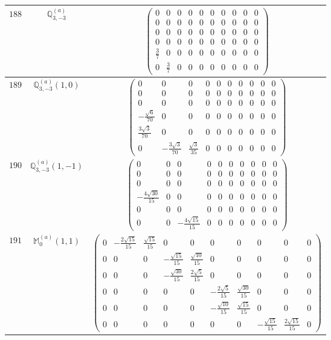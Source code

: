 \documentclass[fleqn,8pt,landscape]{jsarticle}
\begin{document}
\begin{center}
\begin{longtable}{ccc}
$ 188 $ & $ \mathbb{Q}_{3,-3}^{(a)} $ & $ \begin{pmatrix} 0 & 0 & 0 & 0 & 0 & 0 & 0 & 0 & 0 & 0 \\ 0 & 0 & 0 & 0 & 0 & 0 & 0 & 0 & 0 & 0 \\ 0 & 0 & 0 & 0 & 0 & 0 & 0 & 0 & 0 & 0 \\ 0 & 0 & 0 & 0 & 0 & 0 & 0 & 0 & 0 & 0 \\ \frac{3}{7} & 0 & 0 & 0 & 0 & 0 & 0 & 0 & 0 & 0 \\ 0 & \frac{3}{7} & 0 & 0 & 0 & 0 & 0 & 0 & 0 & 0 \end{pmatrix} $ \\ \hline
$ 189 $ & $ \mathbb{Q}_{3,-3}^{(a)}(1,0) $ & $ \begin{pmatrix} 0 & 0 & 0 & 0 & 0 & 0 & 0 & 0 & 0 & 0 \\ 0 & 0 & 0 & 0 & 0 & 0 & 0 & 0 & 0 & 0 \\ 0 & 0 & 0 & 0 & 0 & 0 & 0 & 0 & 0 & 0 \\ - \frac{\sqrt{6}}{70} & 0 & 0 & 0 & 0 & 0 & 0 & 0 & 0 & 0 \\ \frac{3 \sqrt{3}}{70} & 0 & 0 & 0 & 0 & 0 & 0 & 0 & 0 & 0 \\ 0 & - \frac{3 \sqrt{3}}{70} & \frac{\sqrt{3}}{35} & 0 & 0 & 0 & 0 & 0 & 0 & 0 \end{pmatrix} $ \\ \hline
$ 190 $ & $ \mathbb{Q}_{3,-3}^{(a)}(1,-1) $ & $ \begin{pmatrix} 0 & 0 & 0 & 0 & 0 & 0 & 0 & 0 & 0 & 0 \\ 0 & 0 & 0 & 0 & 0 & 0 & 0 & 0 & 0 & 0 \\ 0 & 0 & 0 & 0 & 0 & 0 & 0 & 0 & 0 & 0 \\ - \frac{4 \sqrt{30}}{15} & 0 & 0 & 0 & 0 & 0 & 0 & 0 & 0 & 0 \\ 0 & 0 & 0 & 0 & 0 & 0 & 0 & 0 & 0 & 0 \\ 0 & 0 & - \frac{4 \sqrt{15}}{15} & 0 & 0 & 0 & 0 & 0 & 0 & 0 \end{pmatrix} $ \\ \hline
$ 191 $ & $ \mathbb{M}_{0}^{(a)}(1,1) $ & $ \begin{pmatrix} 0 & - \frac{2 \sqrt{15}}{15} & \frac{\sqrt{15}}{15} & 0 & 0 & 0 & 0 & 0 & 0 & 0 \\ 0 & 0 & 0 & - \frac{\sqrt{15}}{15} & \frac{\sqrt{10}}{15} & 0 & 0 & 0 & 0 & 0 \\ 0 & 0 & 0 & - \frac{\sqrt{30}}{15} & \frac{2 \sqrt{5}}{15} & 0 & 0 & 0 & 0 & 0 \\ 0 & 0 & 0 & 0 & 0 & - \frac{2 \sqrt{5}}{15} & \frac{\sqrt{30}}{15} & 0 & 0 & 0 \\ 0 & 0 & 0 & 0 & 0 & - \frac{\sqrt{10}}{15} & \frac{\sqrt{15}}{15} & 0 & 0 & 0 \\ 0 & 0 & 0 & 0 & 0 & 0 & 0 & - \frac{\sqrt{15}}{15} & \frac{2 \sqrt{15}}{15} & 0 \end{pmatrix} $ \\ \hline

\end{longtable}
\end{center}
\end{document}
